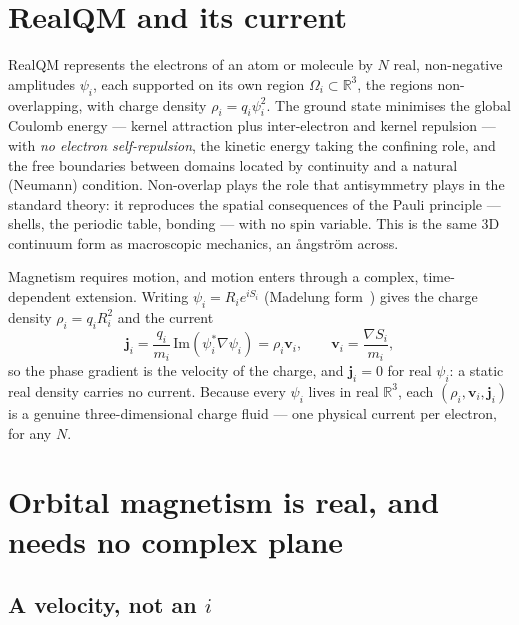 \documentclass[11pt]{article}
\begin{document}
\section{RealQM and its current}
\label{sec:realqm}

RealQM represents the electrons of an atom or molecule by $N$ real, non-negative amplitudes $\psi_i$, each
supported on its own region $\Omega_i\subset\mathbb R^3$, the regions non-overlapping, with charge density
$\rho_i=q_i\psi_i^2$. The ground state minimises the global Coulomb energy --- kernel attraction plus
inter-electron and kernel repulsion --- with \emph{no electron self-repulsion}, the kinetic energy taking the
confining role, and the free boundaries between domains located by continuity and a natural (Neumann) condition.
Non-overlap plays the role that antisymmetry plays in the standard theory: it reproduces the spatial
consequences of the Pauli principle --- shells, the periodic table, bonding --- with no spin variable. This is
the same $3$D continuum form as macroscopic mechanics, an ångström across.

Magnetism requires motion, and motion enters through a complex, time-dependent extension. Writing
$\psi_i=R_i e^{iS_i}$ (Madelung form~\cite{Madelung}) gives the charge density $\rho_i=q_iR_i^2$ and the current
\begin{equation}
\mathbf j_i=\frac{q_i}{m_i}\,\mathrm{Im}(\psi_i^*\nabla\psi_i)=\rho_i\mathbf v_i,\qquad
\mathbf v_i=\frac{\nabla S_i}{m_i},
\label{eq:current}
\end{equation}
so the phase gradient is the velocity of the charge, and $\mathbf j_i=0$ for real $\psi_i$: a static real density
carries no current. Because every $\psi_i$ lives in real $\mathbb R^3$, each $(\rho_i,\mathbf v_i,\mathbf j_i)$
is a genuine three-dimensional charge fluid --- one physical current per electron, for any $N$.

\section{Orbital magnetism is real, and needs no complex plane}
\label{sec:orbital}

\subsection{A velocity, not an \texorpdfstring{$i$}{i}}
\end{document}
